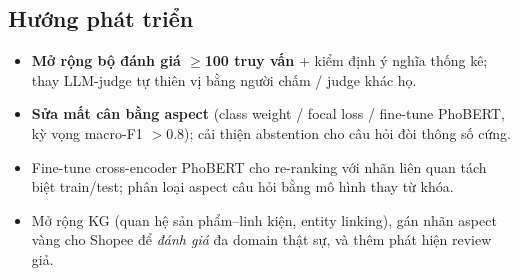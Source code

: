 \documentclass[12pt,a4paper]{article}
\begin{document}
\subsection{Hướng phát triển}
\begin{itemize}
  \item \textbf{Mở rộng bộ đánh giá $\geq$100 truy vấn} + kiểm định ý nghĩa thống kê; thay LLM-judge tự thiên vị bằng người chấm / judge khác họ.
  \item \textbf{Sửa mất cân bằng aspect} (class weight / focal loss / fine-tune PhoBERT, kỳ vọng macro-F1 $>$0.8); cải thiện abstention cho câu hỏi đòi thông số cứng.
  \item Fine-tune cross-encoder PhoBERT cho re-ranking với nhãn liên quan tách biệt train/test; phân loại aspect câu hỏi bằng mô hình thay từ khóa.
  \item Mở rộng KG (quan hệ sản phẩm--linh kiện, entity linking), gán nhãn aspect vàng cho Shopee để \textit{đánh giá} đa domain thật sự, và thêm phát hiện review giả.
\end{itemize}
\end{document}
